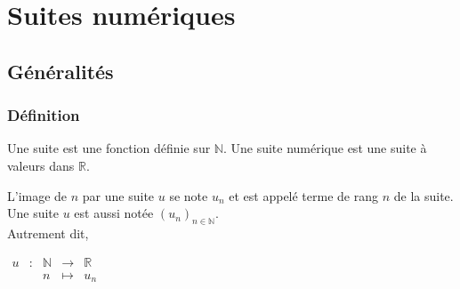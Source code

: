 \documentclass[french]{book}
\newcommand{\R}{\mathbb {R}}
\newcommand{\N}{\mathbb {N}}
\newcommand{\fr}[2]{\dfrac{#1}{#2}}
\newcommand{\suite}[1][u]{\left( #1_{n} \right)_{n\in\N}}
\begin{document}

\chapter{Suites numériques}

\section{Généralités}
\subsection{Définition}
\begin{defn}
Une suite est une fonction définie sur $\N$. Une suite numérique est une suite à valeurs dans $\R$.

 L'image de $n$ par une suite $u$ se note $u_{n}$ et est appelé terme de rang $n$ de la suite. Une suite $u$ est aussi notée $\suite[u]$.\\
 
Autrement dit, 
\begin{center}
$\begin{array}{ccccc}
u & : & \mathbb{N} & \to & \mathbb{R} \\
 & & n & \mapsto & u_n\\
\end{array}$
\end{center}
\end{defn}
\end{document}
